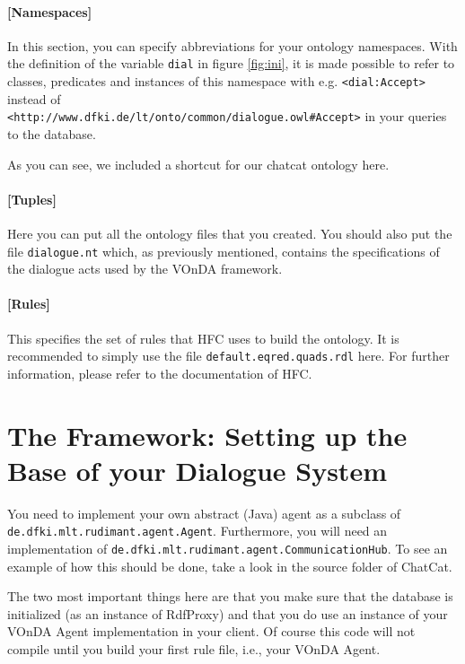 \documentclass[a4paper]{report}
\newcommand{\vonda}{VOnDA\xspace}
\begin{document}
\paragraph{[Namespaces]}

In this section, you can specify abbreviations for your ontology namespaces. With the definition of the variable \texttt{dial} in figure \ref{fig:ini}, it is made possible to refer to classes, predicates and instances of this namespace with e.g. \texttt{<dial:Accept>} instead of\\ \texttt{<http://www.dfki.de/lt/onto/common/dialogue.owl\#Accept>} in your queries to the database.

As you can see, we included a shortcut for our chatcat ontology here.

\paragraph{[Tuples]}

Here you can put all the ontology files that you created. You should also put the file \texttt{dialogue.nt} which, as previously mentioned, contains the specifications of the dialogue acts used by the \vonda framework.

\paragraph{[Rules]}

This specifies the set of rules that HFC uses to build the ontology. It is recommended to simply use the file \texttt{default.eqred.quads.rdl} here. For further information, please refer to the documentation of HFC.


\section{The Framework: Setting up the Base of your Dialogue System}

You need to implement your own abstract (Java) agent as a subclass of \texttt{de.dfki.mlt.rudimant.agent.Agent}. Furthermore, you will need an implementation of \texttt{de.dfki.mlt.rudimant.agent.CommunicationHub}. To see an example of how this should be done, take a look in the source folder of ChatCat.

The two most important things here are that you make sure that the database is initialized (as an instance of RdfProxy) and that you do use an instance of your \vonda Agent implementation in your client. Of course this code will not compile until you build your first rule file, i.e., your \vonda Agent.
\end{document}
